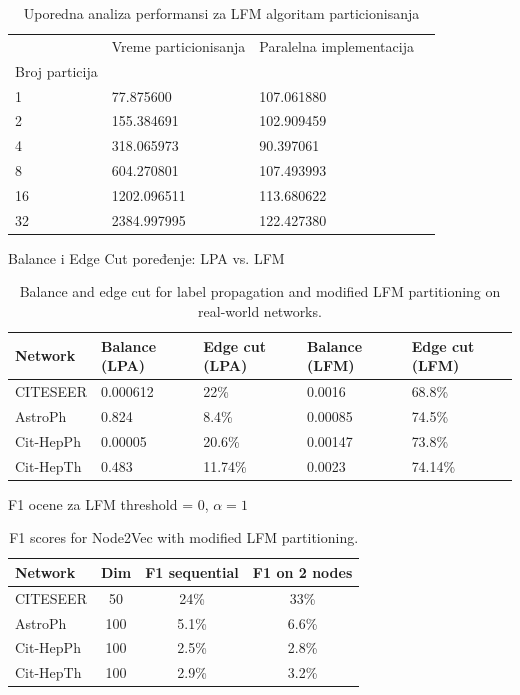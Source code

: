\documentclass{beamer}
\begin{document}
\begin{frame}
\begin{table}
    
\caption{Uporedna analiza performansi za LFM algoritam particionisanja}
\label{tab:Performance_comparison_max_Node2Vec_vs_lfm_on_SBM_10M_with_varying_partition_num}
\begin{tabular}{p{1in}p{1in}p{1in}p{1in}}
\hline
 & Vreme particionisanja & Paralelna implementacija \\
Broj particija &  &  &  \\
\hline
1 & 77.875600 & 107.061880  \\
2 & 155.384691 & 102.909459 \\
4 & 318.065973 & 90.397061 \\
8 & 604.270801 & 107.493993 \\
16 & 1202.096511 & 113.680622 \\
32 & 2384.997995 & 122.427380 \\
\hline
\end{tabular}
\end{table}
\end{frame}

\begin{frame}{Balance i Edge Cut poređenje: LPA vs. LFM}
\begin{table}[h]
\centering
\begin{tabular}{lp{1.2cm}p{1.2cm}p{1.2cm}p{1.2cm}}
\hline
\textbf{Network} & \textbf{Balance (LPA)} & \textbf{Edge cut (LPA)} & \textbf{Balance (LFM)} & \textbf{Edge cut (LFM)} \\
\hline
CITESEER   & 0.000612 & 22\%    & 0.0016  & 68.8\%  \\
AstroPh    & 0.824    & 8.4\%   & 0.00085 & 74.5\%  \\
Cit-HepPh  & 0.00005  & 20.6\%  & 0.00147 & 73.8\%  \\
Cit-HepTh  & 0.483    & 11.74\% & 0.0023  & 74.14\% \\
\hline
\end{tabular}
\caption*{Balance and edge cut for label propagation and modified LFM partitioning on real-world networks.}
\end{table}
\end{frame}


\begin{frame}{F1 ocene za LFM threshold = 0, $\alpha = 1$}
\begin{table}[h]
\centering
\begin{tabular}{lccc}
\hline
\textbf{Network} & \textbf{Dim} & \textbf{F1 sequential} & \textbf{F1 on 2 nodes} \\
\hline
CITESEER   & 50  & 24\%  & 33\% \\
AstroPh    & 100 & 5.1\% & 6.6\% \\
Cit-HepPh  & 100 & 2.5\% & 2.8\% \\
Cit-HepTh  & 100 & 2.9\% & 3.2\% \\
\hline
\end{tabular}
\caption*{F1 scores for Node2Vec with modified LFM partitioning.}
\end{table}
\end{frame}
\end{document}
